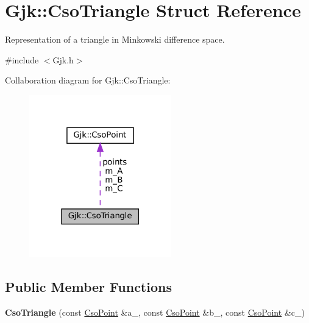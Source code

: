 \hypertarget{structGjk_1_1CsoTriangle}{}\section{Gjk\+:\+:Cso\+Triangle Struct Reference}
\label{structGjk_1_1CsoTriangle}


Representation of a triangle in Minkowski difference space.  




{\ttfamily \#include $<$Gjk.\+h$>$}



Collaboration diagram for Gjk\+:\+:Cso\+Triangle\+:
\nopagebreak
\begin{figure}[H]
\begin{center}
\leavevmode
\includegraphics[width=175pt]{structGjk_1_1CsoTriangle__coll__graph}
\end{center}
\end{figure}
\subsection*{Public Member Functions}
\begin{DoxyCompactItemize}
\item 
\mbox{\label{structGjk_1_1CsoTriangle_a16bd3105b189e3003fcc9cc27e57e90d}} 
{\bfseries Cso\+Triangle} (const \hyperlink{structGjk_1_1CsoPoint}{Cso\+Point} \&a\+\_\+, const \hyperlink{structGjk_1_1CsoPoint}{Cso\+Point} \&b\+\_\+, const \hyperlink{structGjk_1_1CsoPoint}{Cso\+Point} \&c\+\_\+)
\end{DoxyCompactItemize}
